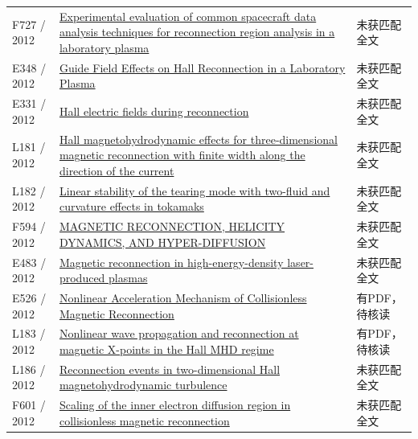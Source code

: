 \begin{longtable}{P{24mm}P{97mm}P{27mm}}
F727 / 2012 & \href{https://doi.org/10.1029/2012ja017742}{Experimental evaluation of common spacecraft data analysis techniques for reconnection region analysis in a laboratory plasma} & 未获匹配全文\\

E348 / 2012 & \href{http://absimage.aps.org/image/DPP12/MWS_DPP12-2012-000125.pdf}{Guide Field Effects on Hall Reconnection in a Laboratory Plasma} & 未获匹配全文\\

E331 / 2012 & \href{https://ui.adsabs.harvard.edu/abs/2012cosp...39..641G/abstract}{Hall electric fields during reconnection} & 未获匹配全文\\

L181 / 2012 & \href{https://doi.org/10.1029/2011ja017006}{Hall magnetohydrodynamic effects for three‐dimensional magnetic reconnection with finite width along the direction of the current} & 未获匹配全文\\

L182 / 2012 & \href{https://doi.org/10.1063/1.4754000}{Linear stability of the tearing mode with two-fluid and curvature effects in tokamaks} & 未获匹配全文\\

F594 / 2012 & \href{https://doi.org/10.1088/0004-637x/757/2/173}{MAGNETIC RECONNECTION,  HELICITY DYNAMICS,  AND HYPER-DIFFUSION} & 未获匹配全文\\

E483 / 2012 & \href{https://doi.org/10.1063/1.3694119}{Magnetic reconnection in high-energy-density laser-produced plasmas} & 未获匹配全文\\

E526 / 2012 & \href{https://doi.org/10.48550/arxiv.1210.0630}{Nonlinear Acceleration Mechanism of Collisionless Magnetic Reconnection} & 有PDF，待核读\\

L183 / 2012 & \href{https://doi.org/10.1051/0004-6361/201219098}{Nonlinear wave propagation and reconnection at magnetic X-points in the Hall MHD regime} & 有PDF，待核读\\

L186 / 2012 & \href{https://doi.org/10.1063/1.4754151}{Reconnection events in two-dimensional Hall magnetohydrodynamic turbulence} & 未获匹配全文\\

F601 / 2012 & \href{https://doi.org/10.1029/2011ja017464}{Scaling of the inner electron diffusion region in collisionless magnetic reconnection} & 未获匹配全文\\


\end{longtable}

